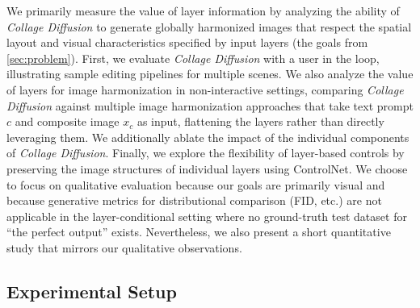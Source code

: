 We primarily measure the value of layer information by analyzing the ability of \textit{Collage Diffusion} to generate globally harmonized images that respect the spatial layout and visual characteristics specified by input layers (the goals from \cref{sec:problem}). 
First, we evaluate \textit{Collage Diffusion} with a user in the loop, illustrating sample editing pipelines for multiple scenes.
We also analyze the value of layers for image harmonization in non-interactive settings, comparing \textit{Collage Diffusion} against multiple image harmonization approaches that take text prompt $c$ and composite image $x_c$ as input, flattening the layers rather than directly leveraging them. 
We additionally ablate the impact of the individual components of \textit{Collage Diffusion}. 
Finally, we explore the flexibility of layer-based controls by preserving the image structures of individual layers using ControlNet. 
We choose to focus on qualitative evaluation because our goals are primarily visual and because generative metrics for distributional comparison (FID, etc.) are not applicable in the layer-conditional setting where no ground-truth test dataset for ``the perfect output'' exists. 
Nevertheless, we also present a short quantitative study that mirrors our qualitative observations.

\vspace{-0.5em}
\subsection{Experimental Setup}
\vspace{-0.5em}

